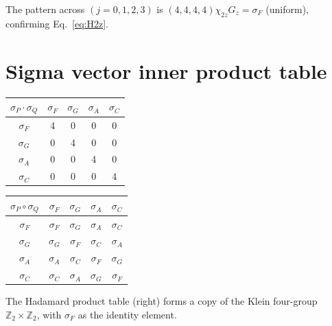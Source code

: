 \documentclass[11pt,a4paper]{article}
\newcommand{\sF}{\sigma_F}
\newcommand{\sG}{\sigma_G}
\newcommand{\sA}{\sigma_A}
\newcommand{\sC}{\sigma_C}
\begin{document}
The pattern across $(j=0,1,2,3)$ is $(4,4,4,4)\chi_{2z}G_z = \sF$ (uniform),
confirming Eq.~\eqref{eq:H2z}.

\section{Sigma vector inner product table}
\label{app:sigma}

\begin{center}
\begin{tabular}{c|cccc}
$\sigma_P\cdot\sigma_Q$ & $\sF$ & $\sG$ & $\sA$ & $\sC$ \\
\hline
$\sF$ & 4 & 0 & 0 & 0 \\
$\sG$ & 0 & 4 & 0 & 0 \\
$\sA$ & 0 & 0 & 4 & 0 \\
$\sC$ & 0 & 0 & 0 & 4 \\
\end{tabular}
\qquad\qquad
\begin{tabular}{c|cccc}
$\sigma_P\circ\sigma_Q$ & $\sF$ & $\sG$ & $\sA$ & $\sC$ \\
\hline
$\sF$ & $\sF$ & $\sG$ & $\sA$ & $\sC$ \\
$\sG$ & $\sG$ & $\sF$ & $\sC$ & $\sA$ \\
$\sA$ & $\sA$ & $\sC$ & $\sF$ & $\sG$ \\
$\sC$ & $\sC$ & $\sA$ & $\sG$ & $\sF$ \\
\end{tabular}
\end{center}

The Hadamard product table (right) forms a copy of the Klein four-group
$\mathbb{Z}_2\times\mathbb{Z}_2$, with $\sF$ as the identity element.
\end{document}
